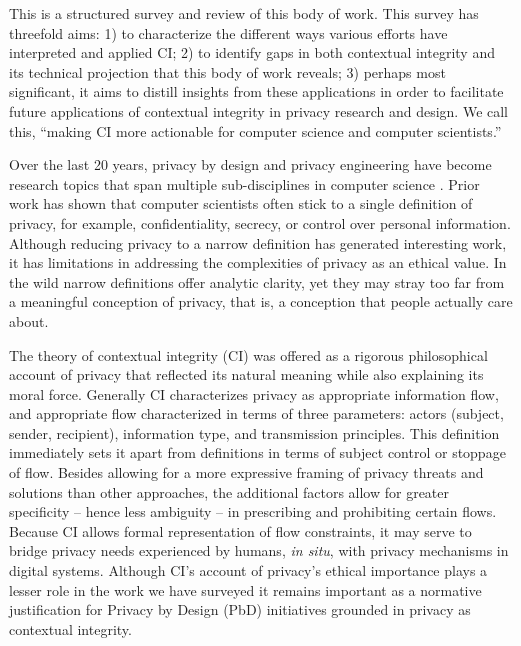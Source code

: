 \documentclass[../thesis.tex]{subfiles}
\begin{document}
This is a structured survey and review of this body of work. This survey
has threefold aims: 1) to characterize the different ways various
efforts have interpreted and applied CI; 2) to identify gaps in both
contextual integrity and its technical projection that this body of
work reveals; 3) perhaps most significant, it aims to distill insights
from these applications in order to facilitate future applications of
contextual integrity in privacy research and design. We call this,
``making CI more actionable for computer science and
computer scientists.''

Over the last 20 years, privacy by design \citep{cavoukian2009whole,
federalprotecting, regulation2016regulation} and privacy engineering
\citep{gurses2016privacy} have become research topics that span
multiple sub-disciplines in computer science
\citep{rubinstein2010privacy, danezis2015privacy}.
Prior work has shown that computer scientists often stick
to a single definition of privacy, for example, confidentiality,
secrecy, or control over personal information. Although reducing
privacy to a narrow definition has generated interesting work, it has
limitations in addressing the complexities of privacy as an ethical
value. In the wild narrow definitions offer analytic clarity, yet they
may stray too far from a meaningful conception of privacy, that is, a
conception that people actually care about. 

The theory of contextual integrity (CI) was offered as a rigorous
philosophical account of privacy that reflected its natural meaning
while also explaining its moral force. Generally CI characterizes
privacy as appropriate information flow, and appropriate flow
characterized in terms of three parameters: actors (subject, sender,
recipient), information type, and transmission principles. This
definition immediately sets it apart from definitions in terms of
subject control or stoppage of flow. Besides allowing for a more
expressive framing of privacy threats and solutions than other
approaches, the additional factors allow for greater specificity --
hence less ambiguity -- in prescribing and prohibiting certain flows.
Because CI allows formal representation of flow constraints, it may
serve to bridge privacy needs experienced by humans, \textit{in situ},
with
privacy mechanisms in digital systems. Although CI's
account of privacy's ethical importance plays a lesser
role in the work we have surveyed it remains important as a normative
justification for Privacy by Design (PbD) initiatives grounded in
privacy as contextual integrity.
\end{document}
